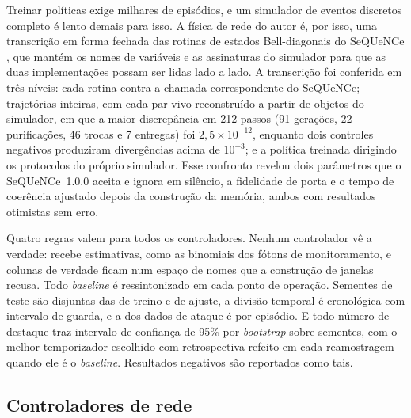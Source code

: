 \documentclass[12pt]{article}
\begin{document}
Treinar políticas exige milhares de episódios, e um simulador de eventos
discretos completo é lento demais para isso. A física de rede do autor é, por
isso, uma transcrição em forma fechada das rotinas de estados Bell-diagonais do
SeQUeNCe \cite{wu2021}, que mantém os nomes de variáveis e as assinaturas do
simulador para que as duas implementações possam ser lidas lado a lado. A
transcrição foi conferida em três níveis: cada rotina contra a chamada
correspondente do SeQUeNCe; trajetórias inteiras, com cada par vivo reconstruído
a partir de objetos do simulador, em que a maior discrepância em 212 passos (91
gerações, 22 purificações, 46 trocas e 7 entregas) foi $2{,}5\times10^{-12}$,
enquanto dois controles negativos produziram divergências acima de $10^{-3}$; e
a política treinada dirigindo os protocolos do próprio simulador. Esse confronto
revelou dois parâmetros que o SeQUeNCe~1.0.0 aceita e ignora em silêncio, a
fidelidade de porta e o tempo de coerência ajustado depois da construção da
memória, ambos com resultados otimistas sem erro.

Quatro regras valem para todos os controladores. Nenhum controlador vê a
verdade: recebe estimativas, como as binomiais dos fótons de monitoramento, e
colunas de verdade ficam num espaço de nomes que a construção de janelas recusa.
Todo \textit{baseline} é ressintonizado em cada ponto de operação. Sementes de
teste são disjuntas das de treino e de ajuste, a divisão temporal é cronológica
com intervalo de guarda, e a dos dados de ataque é por episódio. E todo número
de destaque traz intervalo de confiança de 95\% por \textit{bootstrap} sobre
sementes, com o melhor temporizador escolhido com retrospectiva refeito em cada
reamostragem quando ele é o \textit{baseline}. Resultados negativos são
reportados como tais.

\subsection{Controladores de rede}
\label{sec:rede}
\end{document}
